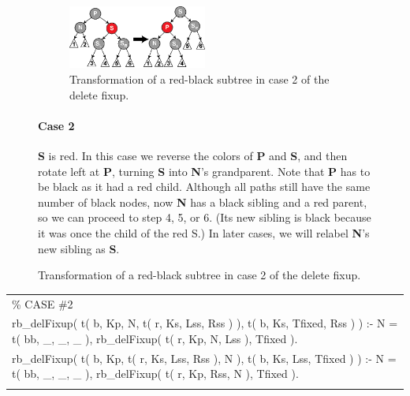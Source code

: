 \documentclass{article}
\newenvironment{code}{\obeycr\begin{it}\nopagebreak\addvspace{1ex}\noindent\footnotesize\begin{tabular}{|p{0.95\textwidth}|}\hline}{\\\hline\end{tabular}\par\addvspace{1ex}\end{it}\restorecr}
\begin{document}
\begin{figure}[h!]
  \begin{figure}
    \includegraphics[width=0.5\textwidth]{Red-black_tree_delete_case_2}
    \caption{Transformation of a red-black subtree in case 2 of the delete fixup.}
    \label{delFix2}
  \end{figure}  
  \paragraph{Case 2}
\textbf{S} is red. In this case we reverse the colors of \textbf{P} and \textbf{S}, and then rotate left at \textbf{P}, turning \textbf{S} into \textbf{N}'s grandparent. Note that \textbf{P} has to be black as it had a red child. Although all paths still have the same number of black nodes, now \textbf{N} has a black sibling and a red parent, so we can proceed to step 4, 5, or 6. (Its new sibling is black because it was once the child of the red S.) In later cases, we will relabel \textbf{N}'s new sibling as \textbf{S}.
\end{figure}

\begin{code}
\% CASE \#2\\
rb\_delFixup( t( b, Kp, N, t( r, Ks, Lss, Rss ) ), t( b, Ks, Tfixed, Rss ) ) :-
\hspace{2ex}N = t( bb, \_, \_, \_ ),
\hspace{2ex}rb\_delFixup( t( r, Kp, N, Lss ), Tfixed ).\\
rb\_delFixup( t( b, Kp, t( r, Ks, Lss, Rss ), N ), t( b, Ks, Lss, Tfixed ) ) :-
\hspace{2ex}N = t( bb, \_, \_, \_ ),
\hspace{2ex}rb\_delFixup( t( r, Kp, Rss, N ), Tfixed ).\\
\end{code}

\pagebreak
\end{document}
